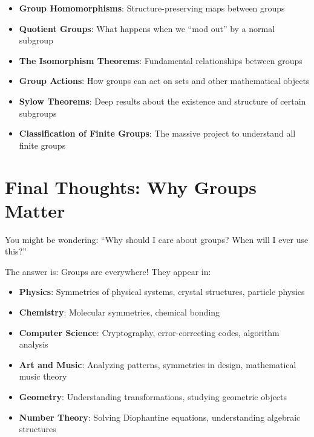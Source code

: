 \documentclass[12pt]{article}
\begin{document}
\begin{itemize}
\item \textbf{\textcolor{KeyTermColor}{Group Homomorphisms}}: Structure-preserving maps between groups
\item \textbf{\textcolor{KeyTermColor}{Quotient Groups}}: What happens when we ``mod out'' by a normal subgroup
\item \textbf{\textcolor{KeyTermColor}{The Isomorphism Theorems}}: Fundamental relationships between groups
\item \textbf{\textcolor{KeyTermColor}{Group Actions}}: How groups can act on sets and other mathematical objects
\item \textbf{\textcolor{KeyTermColor}{Sylow Theorems}}: Deep results about the existence and structure of certain subgroups
\item \textbf{\textcolor{KeyTermColor}{Classification of Finite Groups}}: The massive project to understand all finite groups
\end{itemize}

\section{\textcolor{SectionColor}{Final Thoughts: Why Groups Matter}}

You might be wondering: ``Why should I care about groups? When will I ever use this?''

The answer is: Groups are everywhere! They appear in:

\begin{itemize}
\item \textbf{\textcolor{KeyTermColor}{Physics}}: Symmetries of physical systems, crystal structures, particle physics
\item \textbf{\textcolor{KeyTermColor}{Chemistry}}: Molecular symmetries, chemical bonding
\item \textbf{\textcolor{KeyTermColor}{Computer Science}}: Cryptography, error-correcting codes, algorithm analysis
\item \textbf{\textcolor{KeyTermColor}{Art and Music}}: Analyzing patterns, symmetries in design, mathematical music theory
\item \textbf{\textcolor{KeyTermColor}{Geometry}}: Understanding transformations, studying geometric objects
\item \textbf{\textcolor{KeyTermColor}{Number Theory}}: Solving Diophantine equations, understanding algebraic structures
\end{itemize}
\end{document}
